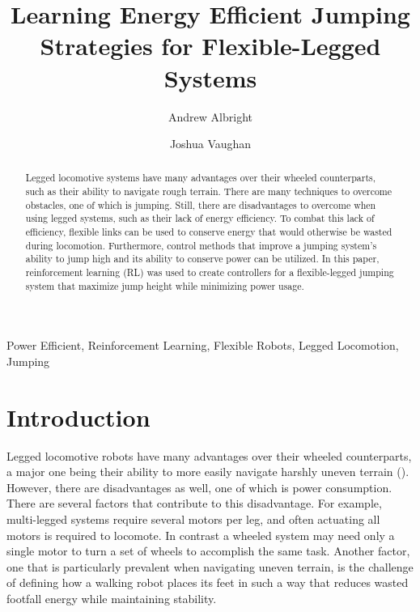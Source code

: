\documentclass{ifacconf}
\begin{document}
\begin{frontmatter}

\title{Learning Energy Efficient Jumping Strategies for Flexible-Legged Systems} 

\author[First]{Andrew Albright} 
\author[Second]{Joshua Vaughan} 

\address[First]{University of Louisiana at Lafayette, 
   Lafayette, LA 70503 USA (andrew.albright1@louisiana.edu)}
\address[Second]{University of Louisiana at Lafayette, 
   Lafayette, LA 70503 USA (joshua.vaughan@louisiana.edu)}

\begin{abstract}                %
   Legged locomotive systems have many advantages over their wheeled counterparts, such as their ability to navigate rough terrain. There are many techniques to overcome obstacles, one of which is jumping. Still, there are disadvantages to overcome when using legged systems, such as their lack of energy efficiency. To combat this lack of efficiency, flexible links can be used to conserve energy that would otherwise be wasted during locomotion. Furthermore, control methods that improve a jumping system's ability to jump high and its ability to conserve power can be utilized. In this paper, reinforcement learning (RL) was used to create controllers for a flexible-legged jumping system that maximize jump height while minimizing power usage.
\end{abstract}

\begin{keyword}
Power Efficient, Reinforcement Learning, Flexible Robots, Legged Locomotion, Jumping
\end{keyword}

\end{frontmatter}


\section{Introduction}
   Legged locomotive robots have many advantages over their wheeled counterparts, a major one being their ability to more easily navigate harshly uneven terrain (\cite{Park2017, Blackman2018, Seok2015}). However, there are disadvantages as well, one of which is power consumption. There are several factors that contribute to this disadvantage. For example, multi-legged systems require several motors per leg, and often actuating all motors is required to locomote. In contrast a wheeled system may need only a single motor to turn a set of wheels to accomplish the same task. Another factor, one that is particularly prevalent when navigating uneven terrain, is the challenge of defining how a walking robot places its feet in such a way that reduces wasted footfall energy while maintaining stability.
\end{document}
